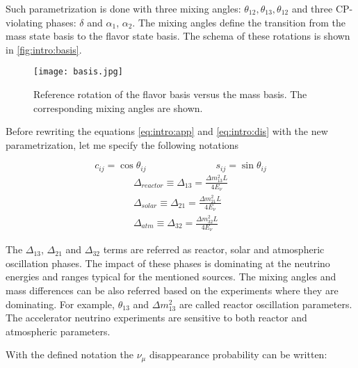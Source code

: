 \documentclass[../main.tex]{subfiles}
\begin{document}
Such parametrization is done with three mixing angles: $\theta_{12}, \theta_{13}, \theta_{12}$ and three CP-violating phases: $\delta$ and $\alpha_1$, $\alpha_2$. The mixing angles define the transition from the mass state basis to the flavor state basis. The schema of these rotations is shown in \autoref{fig:intro:basis}.

\begin{figure}[!ht]
  \centering
  \texttt{[image: basis.jpg]}
  \caption{Reference rotation of the flavor basis versus the mass basis. The corresponding mixing angles are shown.}
  \label{fig:intro:basis}
\end{figure}


Before rewriting the equations \ref{eq:intro:app} and \ref{eq:intro:dis} with the new parametrization, let me specify the following notations

\begin{equation}
c_{ij}=\cos\theta_{ij} \hspace{3cm} s_{ij}=\sin\theta_{ij}
\end{equation}
\begin{align}
\nonumber
\Delta_{reactor} \equiv \Delta_{13} = \frac{\Delta m^2_{13}L}{4E_\nu} \\
\Delta_{solar} \equiv \Delta_{21} = \frac{\Delta m^2_{21}L}{4E_\nu} \\
\Delta_{atm} \equiv\Delta_{32} = \frac{\Delta m^2_{32}L}{4E_\nu} \nonumber
\end{align}

The $\Delta_{13}$, $\Delta_{21}$ and $\Delta_{32}$ terms are referred as reactor, solar and atmospheric oscillation phases. The impact of these phases is dominating at the neutrino energies and ranges typical for the mentioned sources. The mixing angles and mass differences can be also referred based on the experiments where they are dominating. For example, $\theta_{13}$ and $\Delta m^2_{13}$ are called reactor oscillation parameters. The accelerator neutrino experiments are sensitive to both reactor and atmospheric parameters.

With the defined notation the $\nu_\mu$ disappearance probability can be written:
\end{document}

